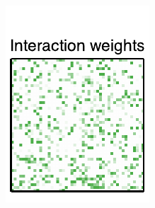 \documentclass[aos,noinfoline]{imsart} %
\begin{document}
\begin{figure}[t!]
\begin{subfigure}[T]{1.2in}
    \includegraphics[width=\textwidth]{network3}
  \end{subfigure}
    ~
  \begin{subfigure}[T]{1.2in}

\end{subfigure}
\end{figure}
\end{document}
